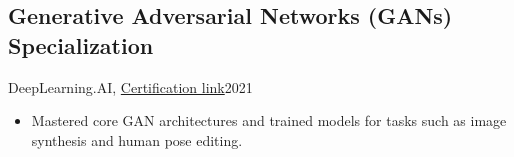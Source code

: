 \subsection{Generative Adversarial Networks (GANs) Specialization}{DeepLearning.AI, \href{https://www.coursera.org/account/accomplishments/certificate/4D9LAW5C45HF}{Certification link}}{2021}
\begin{itemize}
    \item Mastered core GAN architectures and trained models for tasks such as image synthesis and human pose editing.
\end{itemize}




